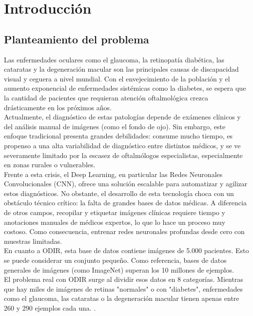 \documentclass[12pt, a4paper]{article}
\begin{document}
\newpage
\tableofcontents
\newpage


\section{Introducción}


\subsection{Planteamiento del problema}
Las enfermedades oculares como el glaucoma, la retinopatía diabética, las cataratas y la degeneración macular son las principales causas de discapacidad visual y ceguera a nivel mundial. Con el envejecimiento de la población y el aumento exponencial de enfermedades sistémicas como la diabetes, se espera que la cantidad de pacientes que requieran atención oftalmológica crezca drásticamente en los próximos años.\\

Actualmente, el diagnóstico de estas patologías depende de exámenes clínicos y del análisis manual de imágenes (como el fondo de ojo). Sin embargo, este enfoque tradicional presenta grandes debilidades: consume mucho tiempo, es propenso a una alta variabilidad de diagnóstico entre distintos médicos, y se ve severamente limitado por la escasez de oftalmólogos especialistas, especialmente en zonas rurales o vulnerables.\\

Frente a esta crisis, el Deep Learning, en particular las Redes Neuronales Convolucionales (CNN), ofrece una solución escalable para automatizar y agilizar estos diagnósticos. No obstante, el desarrollo de esta tecnología choca con un obstáculo técnico crítico: la falta de grandes bases de datos médicas. A diferencia de otros campos, recopilar y etiquetar imágenes clínicas requiere tiempo y anotaciones manuales de médicos expertos, lo que lo hace un proceso muy costoso. Como consecuencia, entrenar redes neuronales profundas desde cero con muestras limitadas.\\

En cuanto a ODIR, esta base de datos contiene imágenes de 5.000 pacientes. Esto se  puede considerar un conjunto pequeño. Como referencia, bases de datos generales de imágenes (como ImageNet) superan los 10 millones de ejemplos.\\

El problema real con ODIR surge al dividir esos datos en 8 categorías. Mientras que hay miles de imágenes de retinas "normales" o con "diabetes", enfermedades como el glaucoma, las cataratas o la degeneración macular tienen apenas entre 260 y 290 ejemplos cada una.
.
\end{document}
